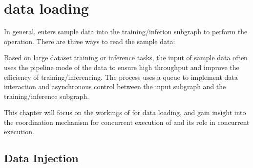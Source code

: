 \begin{savequote}[45mm]
\end{savequote}

\chapter{data loading} 
\label{ch:input-pipeline}

\begin{content}

In general,  enters sample data into the training/inferion subgraph to perform the operation. There are three ways to read the sample data:

\begin{enum}
\end{enum}

Based on large dataset training or inference tasks, the input of sample data often uses the pipeline mode of the data to ensure high throughput and improve the efficiency of training/inferencing. The process uses a queue to implement data interaction and asynchronous control between the input subgraph and the training/inference subgraph.

This chapter will focus on the workings of  for data loading, and gain insight into the coordination mechanism for concurrent execution of  and its role in concurrent execution.

\end{content}

\section{Data Injection}

